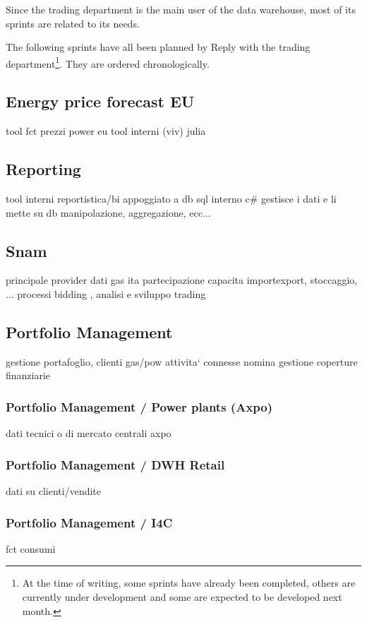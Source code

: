 Since the trading department is the main user of the data warehouse, most of its sprints are related to its needs.

The following sprints have all been planned by Reply with the trading department\footnote{
    At the time of writing, some sprints have already been completed, others are currently under development and some are expected to be developed next month.
}.
They are ordered chronologically.

\subsection{Energy price forecast EU}
    tool fct prezzi power eu
    tool interni (viv)
    julia
\subsection{Reporting}
    tool interni reportistica/bi
    appoggiato a db sql interno
    c\# gestisce i dati e li mette su db
        manipolazione, aggregazione, ecc...
\subsection{Snam}
    principale provider dati gas ita
    partecipazione capacita importexport, stoccaggio, ...
    processi bidding , analisi e sviluppo trading

\subsection{Portfolio Management}
    gestione portafoglio, clienti gas/pow
    attivita` connesse
    nomina
    gestione coperture finanziarie



    \subsubsection{Portfolio Management / Power plants (Axpo)}
        dati tecnici o di mercato centrali axpo
    \subsubsection{Portfolio Management / DWH Retail}
        dati su clienti/vendite
    \subsubsection{Portfolio Management / I4C}
        fct consumi

